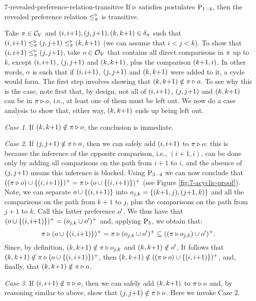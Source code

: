 \begin{lem}{}{7-revealed-preference-relation-transitive}
	If $\triangleright$ satisfies postulates $\mathrm{P}_{1-4}$, 
	then the revealed preference relation $\le_\pi^\triangleright$	
	is transitive.
\end{lem}
\begin{prf*}{}{}%
	Take $\pi\in\mathcal{C}_V$ and $({i},{i}{+}{1}), ({j},{j}{+}{1}), ({k},{k}{+}{1})\in\delta_\pi$
	such that $({i},{i}{+}{1})\le^\triangleright_\pi({j},{j}{+}{1})\le^\triangleright_\pi({k},{k}{+}{1})$
	(we can assume that $i<j<k$).
	To show that $({i},{i}{+}{1})\le^\triangleright_\pi({j},{j}{+}{1})$,
	take $o\in\mathcal{O}_V$ that contains all direct comparisons in $\pi$
	up to $k$, except $({i},{i}{+}{1})$, $({j},{j}{+}{1})$ and $({k},{k}{+}{1})$, 
	plus the comparison $({k}{+}{1},i)$. 
	In other words,
	$o$ is such that if $({i},{i}{+}{1})$, $({j},{j}{+}{1})$ and $({k},{k}{+}{1})$ were added to it,
	a cycle would form.
	The first step involves showing that $({k},{k}{+}{1})\notin\pi\triangleright o$.	
	To see why this is the case, 
	note first that, 
	by design, not all of $({i},{i}{+}{1})$, $({j},{j}{+}{1})$ and $({k},{k}{+}{1})$ can be in $\pi\triangleright o$,
	i.e., at least one of them must be left out. 
	We now do a case analysis
	to show that,
	either way, $({k},{k}{+}{1})$ ends up being left out.
	
	\emph{Case 1}. If $({k},{k}{+}{1})\notin\pi\triangleright o$, the conclusion is immediate.
	
	\emph{Case 2}. If $({j},{j}{+}{1})\notin\pi\triangleright o$, then we can safely add $({i},{i}{+}{1})$ to $\pi\triangleright o$:
	this is because the inference of 
	the opposite comparison, i.e., 
	$(i{+}1,i)$, can be done
	only by adding all comparisons on the path from $i{+}1$ to $i$, and the absence
	of $({j},{j}{+}{1})$ means this inference is blocked. Using $\mathrm{P}_{3-4}$ we can now conclude that
	$((\pi\triangleright o)\cup\{({i},{i}{+}{1})\})^+=\pi\triangleright(o\cup\{({i},{i}{+}{1})\})^+$
	(see Figure \ref{fig:7-acyclic-proof}).
	Note, we can separate $o\cup\{({i},{i}{+}{1})\}$ into $o_{j,k}=\{(k{+}1,j), (j{+}1,k)\}$ and 
	all the comparisons on the path from $k{+}1$ to $j$, plus the comparisons on the path
	from $j{+}1$ to $k$. Call this latter preference $o'$.
	We thus have that $(o\cup\{({i},{i}{+}{1})\})^+=(o_{j,k}\cup o')^+$
	and, applying $\mathrm{P}_{3}$, we obtain that:
	$$
	\pi\triangleright(o\cup\{({i},{i}{+}{1})\})^+ = \pi\triangleright(o_{j,k}\cup o')^+\subseteq((\pi\triangleright o_{j,k})\cup o')^+.
	$$		
	Since, by definition, $({k},{k}{+}{1})\notin\pi\triangleright o_{j,k}$ and $({k},{k}{+}{1})\notin o'$,
	It follows that $({k},{k}{+}{1})\notin\pi\triangleright(o\cup\{({i},{i}{+}{1})\})^+$,
	then $({k},{k}{+}{1})\notin((\pi\triangleright o)\cup\{({i},{i}{+}{1})\})^+$,
	and, finally, that $({k},{k}{+}{1})\notin\pi\triangleright o$.
	
	\emph{Case 3}. 
	If $({i},{i}{+}{1})\notin\pi\triangleright o$, then we can safely add $({k},{k}{+}{1})$ to $\pi\triangleright o$
	and, by reasoning similar to above, show that 
	$({j},{j}{+}{1})\notin\pi\triangleright o$. Here we invoke Case 2.
	

\end{prf*}
